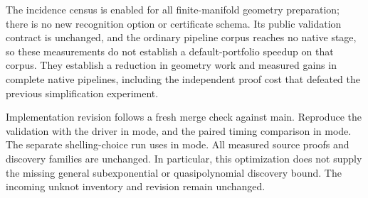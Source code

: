 The incidence census is enabled for all finite-manifold geometry preparation;
there is no new recognition option or certificate schema. Its public
validation contract is unchanged, and the ordinary pipeline corpus reaches
no native stage, so these measurements do not establish a default-portfolio
speedup on that corpus. They establish a reduction in geometry work and
measured gains in complete native pipelines, including the independent proof
cost that defeated the previous simplification experiment.

Implementation revision  follows a fresh merge check against
main. Reproduce the validation with the driver
 in  mode, and the
paired timing comparison in  mode. The separate
shelling-choice run uses  in
 mode. All measured source proofs and discovery
families are unchanged. In particular, this optimization does not supply the
missing general subexponential or quasipolynomial discovery bound. The incoming
unknot inventory and  revision  remain unchanged.
